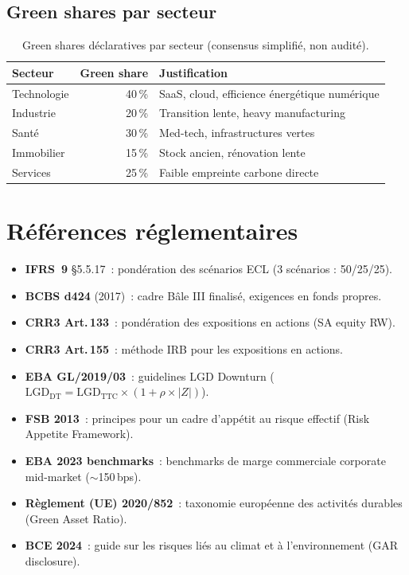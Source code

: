 \documentclass[12pt,a4paper]{article}
\begin{document}
\subsection{Green shares par secteur}

\begin{table}[h]
\centering
\begin{tabular}{lrl}
\toprule
\textbf{Secteur} & \textbf{Green share} & \textbf{Justification} \\
\midrule
Technologie & 40\,\% & SaaS, cloud, efficience \'energ\'etique num\'erique \\
Industrie & 20\,\% & Transition lente, heavy manufacturing \\
Sant\'e & 30\,\% & Med-tech, infrastructures vertes \\
Immobilier & 15\,\% & Stock ancien, r\'enovation lente \\
Services & 25\,\% & Faible empreinte carbone directe \\
\bottomrule
\end{tabular}
\caption{Green shares d\'eclaratives par secteur (consensus simplifi\'e, non audit\'e).}
\label{tab:green_shares}
\end{table}

\section{R\'ef\'erences r\'eglementaires}
\label{sec:references}

\begin{itemize}[nosep]
    \item \textbf{IFRS~9} \S5.5.17~: pond\'eration des sc\'enarios ECL (3 sc\'enarios : 50/25/25).
    \item \textbf{BCBS d424} (2017)~: cadre B\^ale III finalis\'e, exigences en fonds propres.
    \item \textbf{CRR3 Art.\,133}~: pondération des expositions en actions (SA equity RW).
    \item \textbf{CRR3 Art.\,155}~: m\'ethode IRB pour les expositions en actions.
    \item \textbf{EBA GL/2019/03}~: guidelines LGD Downturn ($\text{LGD}_{\text{DT}} = \text{LGD}_{\text{TTC}} \times (1 + \rho \times |Z|)$).
    \item \textbf{FSB 2013}~: principes pour un cadre d'app\'etit au risque effectif (Risk Appetite Framework).
    \item \textbf{EBA 2023 benchmarks}~: benchmarks de marge commerciale corporate mid-market ($\sim$150\,bps).
    \item \textbf{R\`eglement (UE) 2020/852}~: taxonomie europ\'eenne des activit\'es durables (Green Asset Ratio).
    \item \textbf{BCE 2024}~: guide sur les risques li\'es au climat et \`a l'environnement (GAR disclosure).
\end{itemize}
\end{document}
